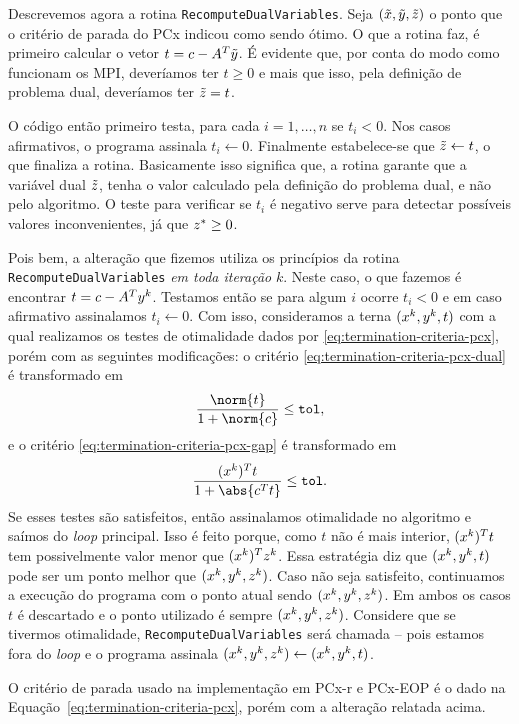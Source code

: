 Descrevemos agora a rotina \verb|RecomputeDualVariables|. Seja $(\tilde{x},\tilde{y},\tilde{z})$ o ponto que o critério de parada do PCx indicou como sendo ótimo. O que a rotina faz, é primeiro calcular o vetor  $t= c - A^T\tilde{y}$. É evidente que, por conta do modo como funcionam os \ac{MPI}, deveríamos ter $t\geq0$ e mais que isso, pela definição de problema dual, deveríamos ter $\tilde{z} = t$. 

 O código então primeiro testa, para cada  $i = 1,\ldots,n$ se $t_{i}<0$.  Nos casos afirmativos, o programa assinala $t_{i}\leftarrow 0$. Finalmente estabelece-se que  $\tilde{z} \leftarrow t $, o que finaliza a rotina. Basicamente isso significa que, a rotina garante que a variável dual $\tilde{z}$, tenha o valor calculado pela definição do problema dual, e não pelo algoritmo. O teste para verificar se $t_{i}$ é negativo serve para detectar possíveis valores inconvenientes, já que $z^*\geq 0$.

 Pois bem, a alteração que fizemos utiliza os princípios da rotina   \verb|RecomputeDualVariables| \emph{em toda iteração} $k$. Neste caso, o que fazemos é encontrar $t= c - A^Ty^{k}$. Testamos então se para algum  $i$ ocorre $t_{i}<0$ e em caso afirmativo assinalamos $t_{i}\leftarrow 0$. Com isso, consideramos a terna $(x^{k},y^{k},t)$ com a qual realizamos os testes de otimalidade dados por
 \eqref{eq:termination-criteria-pcx}, porém com as seguintes modificações: o critério \eqref{eq:termination-criteria-pcx-dual} é transformado em
\[\dfrac{\norm{t}}{1 + \norm{c}} \leq \tol,\]	
e o critério  \eqref{eq:termination-criteria-pcx-gap} é transformado em 
\[
	\dfrac{(\xk)^{T}t}{1 + \abs{c^Tt}}\leq\tol.
\]
Se esses testes são satisfeitos, então assinalamos otimalidade no algoritmo e saímos do \emph{loop} principal. 
Isso é feito porque,  como $t$ não é mais interior, $(x^{k})^{T}t$ tem possivelmente valor menor que $(x^{k})^{T}z^{k}$. Essa estratégia diz que $(x^{k},y^{k},t)$ pode ser um ponto melhor que $(x^{k},y^{k},z^{k})$.  Caso não seja satisfeito, continuamos a execução do programa com o ponto atual sendo $(x^{k},y^{k},z^{k})$. Em ambos os casos $t$ é descartado e o ponto utilizado é sempre $(x^{k},y^{k},z^{k})$. Considere que se tivermos otimalidade, \verb|RecomputeDualVariables| será chamada -- pois estamos fora do \emph{loop} e o programa assinala $(x^{k},y^{k},z^{k})\leftarrow (x^{k},y^{k},t)$. 


O critério de parada usado  na implementação em PCx-r e PCx-EOP é o dado na Equação~\eqref{eq:termination-criteria-pcx}, porém com  a alteração relatada acima. 




